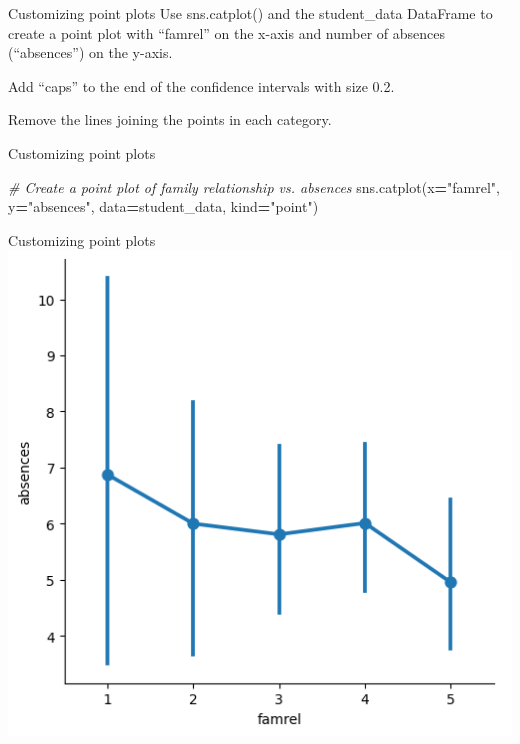 \documentclass[
  ignorenonframetext,
]{beamer}
\newenvironment{Shaded}{\begin{snugshade}}{\end{snugshade}}
\newcommand{\CommentTok}[1]{\textcolor[rgb]{0.56,0.35,0.01}{\textit{#1}}}
\newcommand{\NormalTok}[1]{#1}
\newcommand{\OperatorTok}[1]{\textcolor[rgb]{0.81,0.36,0.00}{\textbf{#1}}}
\newcommand{\StringTok}[1]{\textcolor[rgb]{0.31,0.60,0.02}{#1}}
\begin{document}
\begin{frame}{Customizing point plots}
\label{customizing-point-plots-3}
Use sns.catplot() and the student\_data DataFrame to create a point plot
with ``famrel'' on the x-axis and number of absences (``absences'') on
the y-axis.

Add ``caps'' to the end of the confidence intervals with size 0.2.

Remove the lines joining the points in each category.
\end{frame}

\begin{frame}[fragile]{Customizing point plots}
\label{customizing-point-plots-4}

\begin{Shaded}
\begin{Highlighting}[]
\CommentTok{\# Create a point plot of family relationship vs. absences}
\NormalTok{sns.catplot(x}\OperatorTok{=}\StringTok{"famrel"}\NormalTok{, y}\OperatorTok{=}\StringTok{"absences"}\NormalTok{,}
\NormalTok{            data}\OperatorTok{=}\NormalTok{student\_data,}
\NormalTok{            kind}\OperatorTok{=}\StringTok{"point"}\NormalTok{)}
\end{Highlighting}
\end{Shaded}
\end{frame}

\begin{frame}{Customizing point plots}
\label{customizing-point-plots-5}
\includegraphics{../images/im290.png}
\end{frame}
\end{document}
